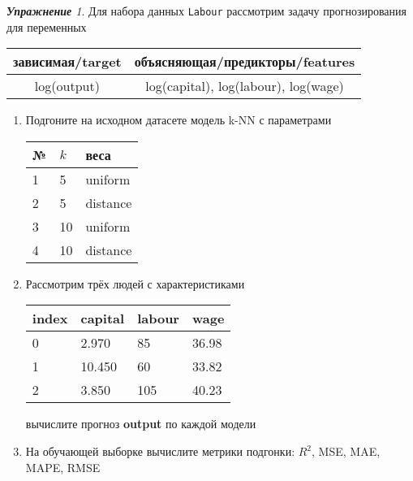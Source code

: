 \documentclass[a4,12pt]{article}
\theoremstyle{remark}
\newtheorem{exercise}{\textbf{Упражнение}}[section]
\begin{document}
\begin{exercise}
Для набора данных \texttt{Labour} рассмотрим задачу прогнозирования
для переменных
\begin{center}
	\begin{tabular}{|c|c|}\hline
		зависимая/target & объясняющая/предикторы/features \\ \hline
		log(output) & log(capital), log(labour), log(wage) \\ \hline
	\end{tabular}
\end{center}
\begin{enumerate}
	\item Подгоните на исходном датасете модель k-NN с параметрами
	\begin{center}
		\begin{tabular}{|l|l|l|}\hline
		№ & \(k\) & веса \\ \hline
		1 & 5 & uniform \\
		2 & 5 & distance \\
		3 & 10 & uniform \\
		4 & 10 & distance \\ \hline
		\end{tabular}
	\end{center}
	\item Рассмотрим трёх людей с характеристиками
	\begin{center}
		\begin{tabular}{|l||l|l|l|}\hline
			index & capital & labour & wage \\ \hline\hline
			0 & 2.970 & 85 & 36.98\\
			1 & 10.450 & 60 & 33.82  \\
			2 & 3.850 & 105 & 40.23\\ \hline
		\end{tabular}
	\end{center}
	вычислите прогноз \textbf{output} по каждой модели

	\item На обучающей выборке вычислите метрики подгонки: \(R^2\), 
	MSE, MAE, MAPE, RMSE
\end{enumerate}
\end{exercise}
\end{document}
